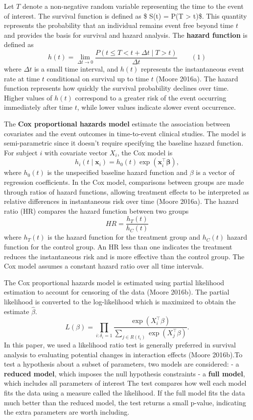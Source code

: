 \documentclass[
  letterpaper,
  DIV=11,
  numbers=noendperiod]{scrartcl}
\begin{document}
Let \(T\) denote a non-negative random variable representing the time to
the event of interest. The survival function is defined as \$ S(t) = P(T
\textgreater{} t)\$. This quantity represents the probability that an
individual remains event free beyond time \(t\) and provides the basis
for survival and hazard analysis. The \textbf{hazard function} is
defined as \[
h(t) = \lim_{\Delta t \to 0} \frac{P(t \le T < t+\Delta t \mid T > t)}{\Delta t} \qquad (1)
\] where \(\Delta t\) is a small time interval, and \(h(t)\) represents
the instantaneous event rate at time \(t\) conditional on survival up to
time \(t\) (Moore 2016a). The hazard function represents how quickly the
survival probability declines over time. Higher values of \(h(t)\)
correspond to a greater risk of the event occurring immediately after
time \(t\), while lower values indicate slower event occurrence.

The \textbf{Cox proportional hazards model} estimate the association
between covariates and the event outcomes in time-to-event clinical
studies. The model is semi-parametric since it doesn't require
specifying the baseline hazard function. For subject \(i\) with
covariate vector \({X}_i\), the Cox model is \[
h_i(t \mid \mathbf{x}_i) = h_0(t) \exp(\mathbf{x}_i^\top \boldsymbol{\beta}),
\] where \({h}_0(t)\) is the unspecified baseline hazard function and
\(\beta\) is a vector of regression coefficients. In the Cox model,
comparisons between groups are made through ratios of hazard functions,
allowing treatment effects to be interpreted as relative differences in
instantaneous risk over time (Moore 2016a). The hazard ratio (HR)
compares the hazard function between two groups \[
HR = \frac{h_T(t)}{h_C(t)}
\] where \(h_T(t)\) is the hazard function for the treatment group and
\(h_C(t)\) hazard function for the control group. An HR less than one
indicates the treatment reduces the instantaneous risk and is more
effective than the control group. The Cox model assumes a constant
hazard ratio over all time intervals.

The Cox proportional hazards model is estimated using partial likelihood
estimation to account for censoring of the data (Moore 2016b). The
partial likelihood is converted to the log-likelihood which is maximized
to obtain the estimate \(\hat{\beta}\). \[
L(\beta) = \prod_{i:\delta_i=1} 
\frac{\exp\left(X_i^\top \beta\right)}
{\sum_{j \in R(t_i)} \exp\left(X_j^\top \beta\right)}.
\] In this paper, we used a likelihood ratio test is generally preferred
in survival analysis to evaluating potential changes in interaction
effects (Moore 2016b).To test a hypothesis about a subset of parameters,
two models are considered: - a \textbf{reduced model}, which imposes the
null hypothesis constraints - a \textbf{full model}, which includes all
parameters of interest The test compares how well each model fits the
data using a measure called the likelihood. If the full model fits the
data much better than the reduced model, the test returns a small
p-value, indicating the extra parameters are worth including.
\end{document}
